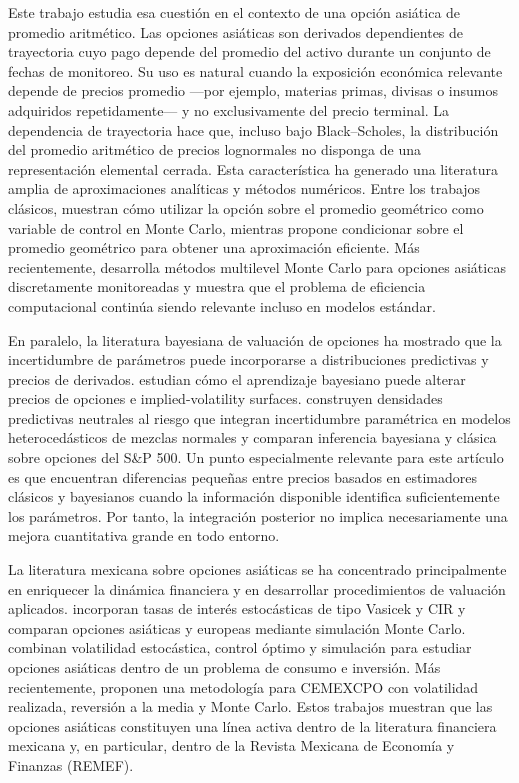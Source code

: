 \documentclass[12pt,letterpaper]{article}
\begin{document}
Este trabajo estudia esa cuestión en el contexto de una opción asiática de promedio aritmético. Las opciones asiáticas son derivados dependientes de trayectoria cuyo pago depende del promedio del activo durante un conjunto de fechas de monitoreo. Su uso es natural cuando la exposición económica relevante depende de precios promedio ---por ejemplo, materias primas, divisas o insumos adquiridos repetidamente--- y no exclusivamente del precio terminal. La dependencia de trayectoria hace que, incluso bajo Black--Scholes, la distribución del promedio aritmético de precios lognormales no disponga de una representación elemental cerrada. Esta característica ha generado una literatura amplia de aproximaciones analíticas y métodos numéricos. Entre los trabajos clásicos, \citet{kemnavorst1990} muestran cómo utilizar la opción sobre el promedio geométrico como variable de control en Monte Carlo, mientras \citet{curran1994} propone condicionar sobre el promedio geométrico para obtener una aproximación eficiente. Más recientemente, \citet{kahale2020} desarrolla métodos multilevel Monte Carlo para opciones asiáticas discretamente monitoreadas y muestra que el problema de eficiencia computacional continúa siendo relevante incluso en modelos estándar.

En paralelo, la literatura bayesiana de valuación de opciones ha mostrado que la incertidumbre de parámetros puede incorporarse a distribuciones predictivas y precios de derivados. \citet{guidolin2003} estudian cómo el aprendizaje bayesiano puede alterar precios de opciones e implied-volatility surfaces. \citet{romboutsstentoft2014} construyen densidades predictivas neutrales al riesgo que integran incertidumbre paramétrica en modelos heterocedásticos de mezclas normales y comparan inferencia bayesiana y clásica sobre opciones del S\&P 500. Un punto especialmente relevante para este artículo es que encuentran diferencias pequeñas entre precios basados en estimadores clásicos y bayesianos cuando la información disponible identifica suficientemente los parámetros. Por tanto, la integración posterior no implica necesariamente una mejora cuantitativa grande en todo entorno.

La literatura mexicana sobre opciones asiáticas se ha concentrado principalmente en enriquecer la dinámica financiera y en desarrollar procedimientos de valuación aplicados. \citet{ortiz2016} incorporan tasas de interés estocásticas de tipo Vasicek y CIR y comparan opciones asiáticas y europeas mediante simulación Monte Carlo. \citet{matias2019} combinan volatilidad estocástica, control óptimo y simulación para estudiar opciones asiáticas dentro de un problema de consumo e inversión. Más recientemente, \citet{ortizjimenez2026} proponen una metodología para CEMEXCPO con volatilidad realizada, reversión a la media y Monte Carlo. Estos trabajos muestran que las opciones asiáticas constituyen una línea activa dentro de la literatura financiera mexicana y, en particular, dentro de la Revista Mexicana de Economía y Finanzas (REMEF).
\end{document}
